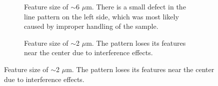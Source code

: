 \begin{figure}[htb]
    \centering
    \begin{subfigure}[t]{0.32\linewidth}
      	\caption{Feature size of $\sim$6 $\mu$m. There is a small defect in the line pattern on the left side, which was most likely caused by improper handling of the sample.}
      	\label{fig:b2d1_q1}
    \end{subfigure}
    \hfill
    \begin{subfigure}[t]{0.32\linewidth}
      	\caption{Feature size of $\sim$2 $\mu$m. The pattern loses its features near the center due to interference effects.}

\end{subfigure}
\end{figure}
